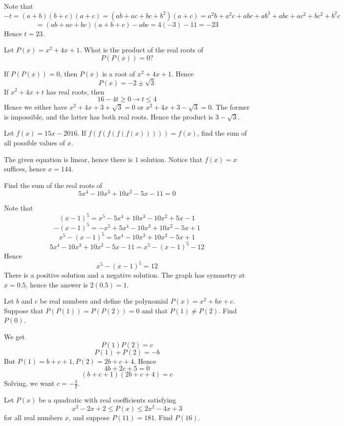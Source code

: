 \documentclass[11pt]{scrartcl}
\begin{document}
\begin{soln}
  Note that
  $$-t=(a+b)(b+c)(a+c)=(ab+ac+bc+b^2)(a+c)=a^2b+a^2c+abc+ab^2+abc+ac^2+bc^2+b^2c$$
  $$=(ab+ac+bc)(a+b+c)-abc=4(-3)-11=-23$$
  Hence $t=23$.
\end{soln}
\begin{example}
  [CMIMC 2018]
  Let $P(x)=x^2+4x+1$. What is the product of the real roots of
  $$P(P(x))=0?$$
\end{example}
\begin{soln}
  If $P(P(x))=0$, then $P(x)$ is a root of $x^2+4x+1$. Hence
  $$P(x)=-2\pm \sqrt{3}$$
  If $x^2+4x+t$ has real roots, then
  $$16-4t\ge 0\to t\le 4$$
  Hence we either have $x^2+4x+3+\sqrt{3}=0$ or $x^2+4x+3-\sqrt{3}=0$.
  The former is impossible, and the latter has both real roots.
  Hence the product is $3-\sqrt{3}$.
\end{soln}
\begin{example}
  [PuMAC 2016]
  Let $f(x)=15x-2016$. If $f(f(f(f(f(x)))))=f(x)$, find the sum of all
  possible values of $x$.
\end{example}
\begin{soln}
  The given equation is linear, hence there is $1$ solution.
  Notice that $f(x)=x$ suffices, hence $x=144$.
\end{soln}
\begin{example}
  [HMMT 2014]
  Find the sum of the real roots of
  $$5x^4-10x^3+10x^2-5x-11=0$$
\end{example}
\begin{soln}
  Note that
  $$(x-1)^5=x^5-5x^4+10x^3-10x^2+5x-1$$
  $$-(x-1)^5=-x^5+5x^4-10x^3+10x^2-5x+1$$
  $$x^5-(x-1)^5=5x^4-10x^3+10x^2-5x+1$$
  $$5x^4-10x^3+10x^2-5x-11=x^5-(x-1)^5-12$$
  Hence
  $$x^5-(x-1)^5=12$$
  There is a positive solution and a negative solution.
  The graph has symmetry at $x=0.5$, hence the answer is $2(0.5)=1$.
\end{soln}
\begin{example}
  [HMMT 2014]
  Let $b$ and $c$ be real numbers and define the polynomial
  $P(x)=x^2+bx+c$. Suppose that $P(P(1))=P(P(2))=0$ and that $P(1)\ne P(2)$.
  Find $P(0)$.
\end{example}
\begin{soln}
  We get
  $$P(1)P(2)=c$$
  $$P(1)+P(2)=-b$$
  But $P(1)=b+c+1, P(2)=2b+c+4$. Hence
  $$4b+2c+5=0$$
  $$(b+c+1)(2b+c+4)=c$$
  Solving, we want $c=-\frac{3}{2}$.
\end{soln}
\begin{example}
  [AIME 2010]
  Let $P(x)$ be a quadratic with real coefficients satisfying
  $$x^2-2x+2\le P(x)\le 2x^2-4x+3$$
  for all real numbers $x$, and suppose $P(11)=181$. Find $P(16)$.
\end{example}
\end{document}

